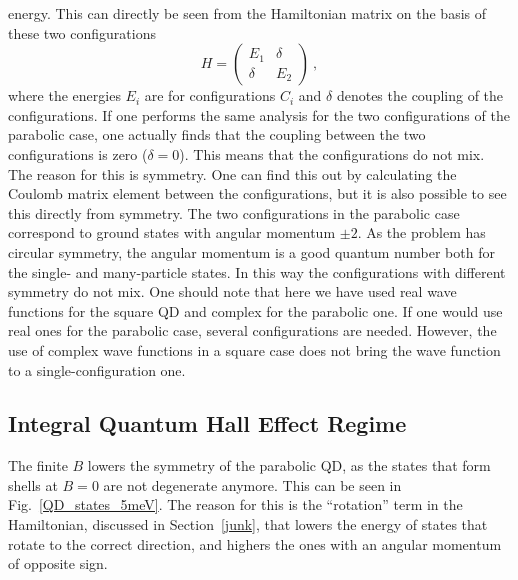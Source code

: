 \documentclass{article}
\begin{document}
energy. This can directly be seen from the Hamiltonian matrix on the
basis of these two configurations
\begin{equation}
H=\left(
\begin{array}{cc}
E_1 & \delta  \\
\delta & E_2 
\end{array} \right) \ ,
\end{equation}
where the energies $E_i$ are for configurations $C_i$ and $\delta$
denotes the coupling of the configurations. If one performs the same
analysis for the two configurations of the parabolic case, one
actually finds that the coupling between the two configurations is
zero ($\delta=0$).  This means that the configurations do not mix. The
reason for this is symmetry. One can find this out by calculating the
Coulomb matrix element between the configurations, but it is also
possible to see this directly from symmetry. The two configurations in
the parabolic case correspond to ground states with angular momentum
$\pm 2$. As the problem has circular symmetry, the angular momentum is
a good quantum number both for the single- and many-particle
states. In this way the configurations with different symmetry do not
mix. One should note that here we have used real wave functions for
the square QD and complex for the parabolic one. If one would use real
ones for the parabolic case, several configurations are
needed\cite{cyrus}. However, the use of complex wave functions in a
square case does not bring the wave function to a single-configuration
one.

\subsection{Integral Quantum Hall Effect Regime}\label{iqhe}

The finite $B$ lowers the symmetry of the parabolic QD, as the states
that form shells at $B=0$ are not degenerate anymore. This can be seen
in Fig.~\ref{QD_states_5meV}. The reason for this is the ``rotation''
term in the Hamiltonian, discussed in Section~\ref{junk}, that lowers
the energy of states that rotate to the correct direction, and highers
the ones with an angular momentum of opposite sign.
\end{document}
